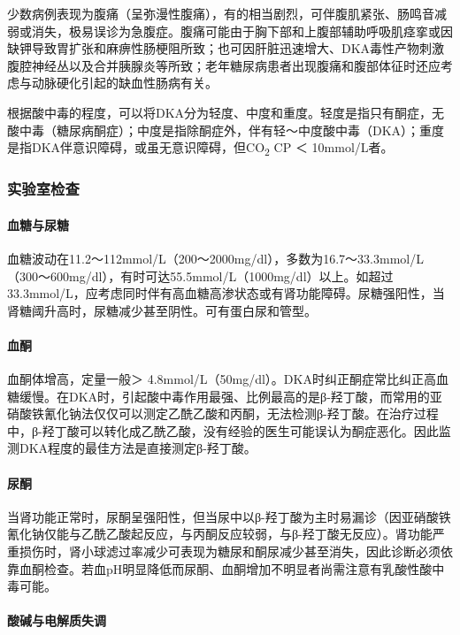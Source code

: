 少数病例表现为腹痛（呈弥漫性腹痛），有的相当剧烈，可伴腹肌紧张、肠鸣音减弱或消失，极易误诊为急腹症。腹痛可能由于胸下部和上腹部辅助呼吸肌痉挛或因缺钾导致胃扩张和麻痹性肠梗阻所致；也可因肝脏迅速增大、DKA毒性产物刺激腹腔神经丛以及合并胰腺炎等所致；老年糖尿病患者出现腹痛和腹部体征时还应考虑与动脉硬化引起的缺血性肠病有关。

根据酸中毒的程度，可以将DKA分为轻度、中度和重度。轻度是指只有酮症，无酸中毒（糖尿病酮症）；中度是指除酮症外，伴有轻～中度酸中毒（DKA）；重度是指DKA伴意识障碍，或虽无意识障碍，但CO\textsubscript{2}
CP ＜ 10mmol/L者。

\subsubsection{实验室检查}

\paragraph{血糖与尿糖}

血糖波动在11.2～112mmol/L（200～2000mg/dl），多数为16.7～33.3mmol/L（300～600mg/dl），有时可达55.5mmol/L（1000mg/dl）以上。如超过33.3mmol/L，应考虑同时伴有高血糖高渗状态或有肾功能障碍。尿糖强阳性，当肾糖阈升高时，尿糖减少甚至阴性。可有蛋白尿和管型。

\paragraph{血酮}

血酮体增高，定量一般＞
4.8mmol/L（50mg/dl）。DKA时纠正酮症常比纠正高血糖缓慢。在DKA时，引起酸中毒作用最强、比例最高的是β-羟丁酸，而常用的亚硝酸铁氰化钠法仅仅可以测定乙酰乙酸和丙酮，无法检测β-羟丁酸。在治疗过程中，β-羟丁酸可以转化成乙酰乙酸，没有经验的医生可能误认为酮症恶化。因此监测DKA程度的最佳方法是直接测定β-羟丁酸。

\paragraph{尿酮}

当肾功能正常时，尿酮呈强阳性，但当尿中以β-羟丁酸为主时易漏诊（因亚硝酸铁氰化钠仅能与乙酰乙酸起反应，与丙酮反应较弱，与β-羟丁酸无反应）。肾功能严重损伤时，肾小球滤过率减少可表现为糖尿和酮尿减少甚至消失，因此诊断必须依靠血酮检查。若血pH明显降低而尿酮、血酮增加不明显者尚需注意有乳酸性酸中毒可能。

\paragraph{酸碱与电解质失调}

